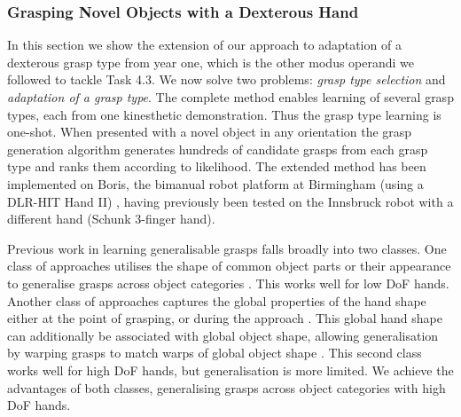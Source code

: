 
\subsubsection{Grasping Novel Objects with a Dexterous Hand}
\label{sec:GraspingNovelObjects}

In this section we show the extension of our approach to adaptation of a dexterous grasp type from year one, which is the other modus operandi we followed to tackle Task 4.3. We now solve two problems: {\em grasp type selection} and {\em adaptation of a grasp type}. The complete method enables learning of several grasp types, each from one kinesthetic demonstration. Thus the grasp type learning is one-shot. When presented with a novel object in any orientation the grasp generation algorithm generates hundreds of candidate grasps from each grasp type and ranks them according to likelihood. The extended method has been implemented on Boris, the bimanual robot platform at Birmingham (using a DLR-HIT Hand II) , having previously been tested on the Innsbruck robot with a different hand (Schunk 3-finger hand).

Previous work in learning generalisable grasps falls broadly into two classes. One class of approaches utilises the shape of common object parts or their appearance to generalise grasps across object categories \cite{saxena2008b,detry2013a,herzog2014a, kroemer2012a}. This works well for low DoF hands. Another class of approaches captures the global properties of the hand shape either at the point of grasping, or during the approach \cite{ben2012generalization}. This global hand shape can additionally be associated with global object shape, allowing generalisation by warping grasps to match warps of global object shape \cite{hillenbrand2012transferring}. This second class works well for high DoF hands, but generalisation is more limited. We achieve the advantages of both classes, generalising grasps across object categories with high DoF hands.

